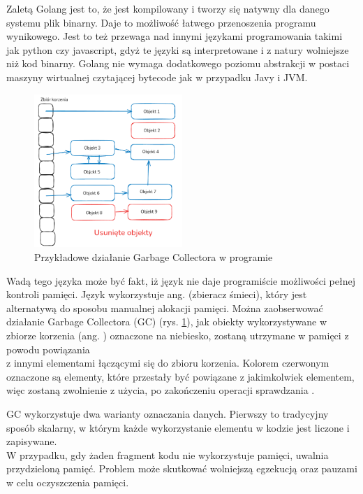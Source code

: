 Zaletą Golang jest to, że jest kompilowany i tworzy się natywny dla danego 
systemu plik binarny. Daje to możliwość łatwego przenoszenia programu wynikowego.
Jest to też przewaga nad innymi językami programowania takimi jak python czy
javascript, gdyż te języki są interpretowane i z natury wolniejsze niż kod 
binarny. Golang nie wymaga dodatkowego poziomu abstrakcji w postaci maszyny 
wirtualnej czytającej bytecode jak w przypadku Javy i JVM.

\begin{figure}[htbp]
    \centering
    \includegraphics[width=0.5\textwidth]{./images/GarbageCollector.png}
    \caption{Przykładowe działanie Garbage Collectora w programie}
    \label{fig:GarbageCollectorImage}
\end{figure}

Wadą tego języka może być fakt, iż język nie daje programiście możliwości pełnej
kontroli pamięci. Język wykorzystuje ang.  (zbieracz 
śmieci), który jest alternatywą do sposobu manualnej alokacji pamięci. Można 
zaobserwować działanie Garbage Collectora (GC) (rys. \ref{fig:GarbageCollectorImage}),
jak obiekty wykorzystywane w zbiorze korzenia (ang. ) oznaczone na 
niebiesko, zostaną utrzymane w pamięci z powodu powiązania \\ z innymi elementami
łączącymi się do zbioru korzenia. Kolorem czerwonym oznaczone są elementy, które
przestały być powiązane z jakimkolwiek elementem, więc zostaną zwolnienie z 
użycia, po zakończeniu operacji sprawdzania \cite{bib:internet:GCImageWiki}.

GC wykorzystuje dwa warianty oznaczania danych. Pierwszy to tradycyjny sposób
skalarny, w którym każde wykorzystanie elementu w kodzie jest liczone i
zapisywane. \\ W przypadku, gdy żaden fragment kodu nie wykorzystuje pamięci,
 uwalnia przydzieloną pamięć. Problem może skutkować
 wolniejszą egzekucją oraz pauzami w celu oczyszczenia pamięci.

